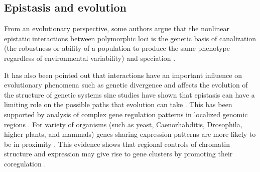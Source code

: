 
\subsection{Epistasis and evolution}

From an evolutionary perspective, some authors argue that the nonlinear epistatic interactions between polymorphic loci is the genetic basis of canalization (the robustness or ability of a population to produce the same phenotype regardless of environmental variability) and speciation \cite{huang2012epistasis}.

It has also been pointed out that interactions have an important influence on evolutionary phenomena such as genetic divergence and affects the evolution of the structure of genetic systems \cite{phillips2008epistasis} sine studies have shown that epistasis can have a limiting role on the possible paths that evolution can take \cite{phillips2008epistasis:REF}.
This has been supported by analysis of complex gene regulation patterns in localized genomic regions \cite{phillips2008epistasis:REF}.
For variety of organisms (such as yeast, Caenorhabditis, Drosophila, higher plants, and mammals) genes sharing expression patterns are more likely to be in proximity \cite{petkov2005evidence:REF}.
This evidence shows that regional controls of chromatin structure and expression may give rise to gene clusters by promoting their coregulation \cite{petkov2005evidence}.

